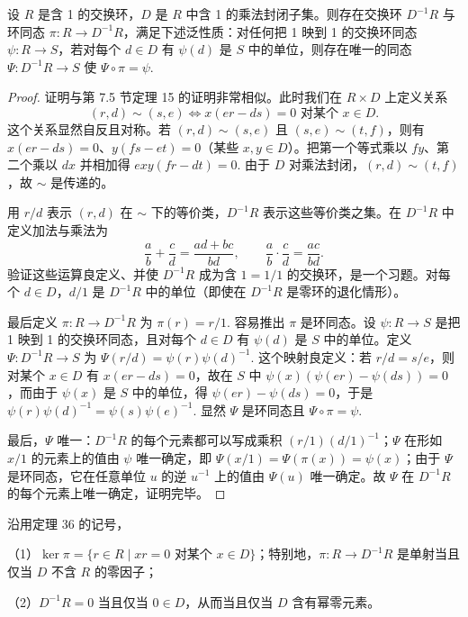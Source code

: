 \begin{theorem}\label{thm:15.36}
设 \(R\) 是含 1 的交换环，\(D\) 是 \(R\) 中含 1 的乘法封闭子集。则存在交换环 \(D^{-1}R\) 与环同态 \(\pi : R \to D^{-1}R\)，满足下述泛性质：对任何把 1 映到 1 的交换环同态 \(\psi : R \to S\)，若对每个 \(d \in D\) 有 \(\psi(d)\) 是 \(S\) 中的单位，则存在唯一的同态 \(\Psi : D^{-1}R \to S\) 使 \(\Psi \circ \pi = \psi\).
\end{theorem}

\begin{proof}
证明与第 7.5 节定理 15 的证明非常相似。此时我们在 \(R \times D\) 上定义关系
\[
(r, d) \sim (s, e) \iff x(er-ds) = 0 \text{ 对某个 } x \in D.
\]
这个关系显然自反且对称。若 \((r,d) \sim (s,e)\) 且 \((s,e) \sim (t,f)\)，则有 \(x(er-ds) = 0\)、\(y(fs-et) = 0\)（某些 \(x, y \in D\)）。把第一个等式乘以 \(fy\)、第二个乘以 \(dx\) 并相加得 \(exy(fr-dt) = 0\). 由于 \(D\) 对乘法封闭，\((r,d) \sim (t,f)\)，故 \(\sim\) 是传递的。

用 \(r/d\) 表示 \((r,d)\) 在 \(\sim\) 下的等价类，\(D^{-1}R\) 表示这些等价类之集。在 \(D^{-1}R\) 中定义加法与乘法为
\[
\frac{a}{b}+\frac{c}{d} = \frac{ad+bc}{bd}, \qquad \frac{a}{b}\cdot\frac{c}{d} = \frac{ac}{bd}.
\]
验证这些运算良定义、并使 \(D^{-1}R\) 成为含 \(1 = 1/1\) 的交换环，是一个习题。对每个 \(d \in D\)，\(d/1\) 是 \(D^{-1}R\) 中的单位（即使在 \(D^{-1}R\) 是零环的退化情形）。

最后定义 \(\pi : R \to D^{-1}R\) 为 \(\pi(r) = r/1\). 容易推出 \(\pi\) 是环同态。设 \(\psi : R \to S\) 是把 1 映到 1 的交换环同态，且对每个 \(d \in D\) 有 \(\psi(d)\) 是 \(S\) 中的单位。定义 \(\Psi : D^{-1}R \to S\) 为 \(\Psi(r/d) = \psi(r)\psi(d)^{-1}\). 这个映射良定义：若 \(r/d = s/e\)，则对某个 \(x \in D\) 有 \(x(er-ds) = 0\)，故在 \(S\) 中 \(\psi(x)(\psi(er)-\psi(ds)) = 0\)，而由于 \(\psi(x)\) 是 \(S\) 中的单位，得 \(\psi(er)-\psi(ds) = 0\)，于是 \(\psi(r)\psi(d)^{-1} = \psi(s)\psi(e)^{-1}\). 显然 \(\Psi\) 是环同态且 \(\Psi \circ \pi = \psi\).

最后，\(\Psi\) 唯一：\(D^{-1}R\) 的每个元素都可以写成乘积 \((r/1)(d/1)^{-1}\)；\(\Psi\) 在形如 \(x/1\) 的元素上的值由 \(\psi\) 唯一确定，即 \(\Psi(x/1) = \Psi(\pi(x)) = \psi(x)\)；由于 \(\Psi\) 是环同态，它在任意单位 \(u\) 的逆 \(u^{-1}\) 上的值由 \(\Psi(u)\) 唯一确定。故 \(\Psi\) 在 \(D^{-1}R\) 的每个元素上唯一确定，证明完毕。
\end{proof}

\begin{corollary}\label{cor:15.37}
沿用定理 36 的记号，

（1）\(\ker\pi = \{r \in R \mid xr = 0 \text{ 对某个 } x \in D\}\)；特别地，\(\pi : R \to D^{-1}R\) 是单射当且仅当 \(D\) 不含 \(R\) 的零因子；

（2）\(D^{-1}R = 0\) 当且仅当 \(0 \in D\)，从而当且仅当 \(D\) 含有幂零元素。
\end{corollary}


